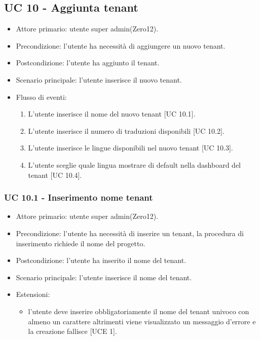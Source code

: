 \subsection{UC 10 - Aggiunta tenant}
    \begin{itemize}
        \item Attore primario: utente super admin(Zero12).
        \item Precondizione: l'utente ha necessità di aggiungere un nuovo tenant.
        \item Postcondizione: l'utente ha aggiunto il tenant.
        \item Scenario principale: l'utente inserisce il nuovo tenant.
        \item Flusso di eventi:
        \begin{enumerate}
            \item L'utente inserisce il nome del nuovo tenant [UC 10.1].
            \item L'utente inserisce il numero di traduzioni disponibili [UC 10.2].
            \item L'utente inserisce le lingue disponibili nel nuovo tenant [UC 10.3].
            \item L'utente sceglie quale lingua mostrare di default nella dashboard del tenant [UC 10.4].
        \end{enumerate}
    \end{itemize}    
    \subsubsection{UC 10.1 - Inserimento nome tenant}
        \begin{itemize}
            \item Attore primario: utente super admin(Zero12).
            \item Precondizione: l'utente ha necessità di inserire un tenant, la procedura di inserimento richiede il nome del progetto.
            \item Postcondizione: l'utente ha inserito il nome del tenant.
            \item Scenario principale: l'utente inserisce il nome del tenant.
            \item Estensioni: 
                \begin{itemize}
                    \item l'utente deve inserire obbligatoriamente il nome del tenant univoco con almeno un carattere altrimenti viene visualizzato un messaggio d'errore e la creazione fallisce [UCE 1].
                \end{itemize}
        \end{itemize}

